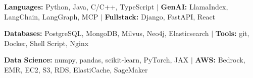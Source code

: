 \item\small{\textbf{Languages:} Python, Java, C/C++, TypeScript $|$ \textbf{GenAI:} LlamaIndex, LangChain, LangGraph, MCP $|$ \textbf{Fullstack:} Django, FastAPI, React}
\item\small{\textbf{Databases:} PostgreSQL, MongoDB, Milvus, Neo4j, Elasticsearch $|$ \textbf{Tools:} git, Docker, Shell Script, Nginx}
\item\small{\textbf{Data Science:} numpy, pandas, scikit-learn, PyTorch, JAX $|$ \textbf{AWS:} Bedrock, EMR, EC2, S3, RDS, ElastiCache, SageMaker}%